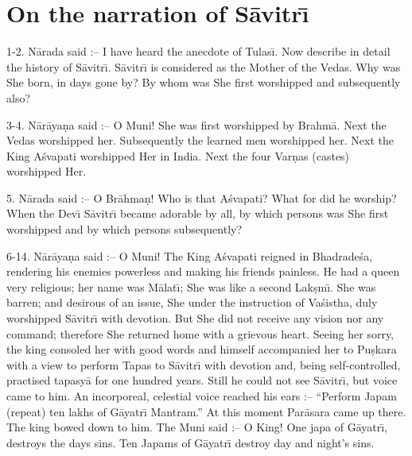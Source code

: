 \chapter{On the narration of S\=avitr\={\i}}

1-2. N\=arada said :-- I have heard the anecdote of Tulas\={\i}. Now describe in detail the history of S\=avitr\={\i}. S\=avitr\={\i} is considered as the Mother of the Vedas. Why was She born, in days gone by? By whom was She first worshipped and subsequently also?

3-4. N\=ar\=aya\d{n}a said :-- O Muni! She was first worshipped by Brahm\=a. Next the Vedas worshipped her. Subsequently the learned men worshipped her. Next the King A\'svapati worshipped Her in India. Next the four Var\d{n}as (castes) worshipped Her.

5. N\=arada said :-- O Br\=ahma\d{n}! Who is that A\'svapati? What for did he worship? When the Dev\={\i} S\=avitr\={\i} became adorable by all, by which persons was She first worshipped and by which persons subsequently?

6-14. N\=ar\=aya\d{n}a said :-- O Muni! The King A\'svapati reigned in Bhadrade\'sa, rendering his enemies powerless and making his friends painless. He had a queen very religious; her name was M\=alat\={\i}; She was like a second Lak\d{s}m\={\i}. She was barren; and desirous of an issue, She under the instruction of Va\'sistha, duly worshipped S\=avitr\={\i} with devotion. But She did not receive any vision nor any command; therefore She returned home with a grievous heart. Seeing her sorry, the king consoled her with good words and himself accompanied her to Pu\d{s}kara with a view to perform Tapas to S\=avitr\={\i} with devotion and, being self-controlled, practised tapasy\=a for one hundred years. Still he could not see S\=avitr\={\i}, but voice came to him. An incorporeal, celestial voice reached his ears :-- ``Perform Japam (repeat) ten lakhs of G\=ayatr\={\i} Mantram.'' At this moment Par\=asara came up there. The king bowed down to him. The Muni said :-- O King! One japa of G\=ayatr\={\i}, destroys the days sins. Ten Japams of G\=ayatr\={\i} destroy day and night's sins.

